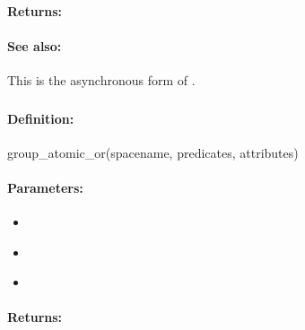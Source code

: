 \paragraph{Returns:}


\paragraph{See also:}  This is the asynchronous form of .

\pagebreak
\subsubsection{}
\label{api:ruby:group_atomic_or}


\paragraph{Definition:}
\begin{rubycode}
group_atomic_or(spacename, predicates, attributes)
\end{rubycode}

\paragraph{Parameters:}
\begin{itemize}[noitemsep]
\item {}\\

\item {}\\

\item {}\\

\end{itemize}

\paragraph{Returns:}


\pagebreak
\subsubsection{}
\label{api:ruby:async_group_atomic_or}


